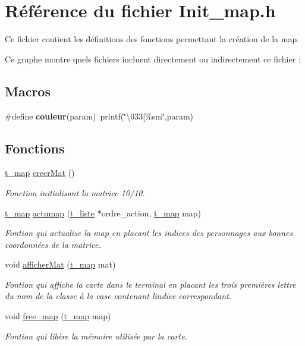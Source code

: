 \hypertarget{a00024}{}\section{Référence du fichier Init\+\_\+map.\+h}
\label{a00024}


Ce fichier contient les définitions des fonctions permettant la création de la map.  


Ce graphe montre quels fichiers incluent directement ou indirectement ce fichier \+:
\subsection*{Macros}
\begin{DoxyCompactItemize}
\item 
\#define {\bfseries couleur}(param)~printf(\char`\"{}\textbackslash{}033\mbox{[}\%sm\char`\"{},param)\hypertarget{a00024_aabcb2d6536b6c0ab41f99493c911489b}{}\label{a00024_aabcb2d6536b6c0ab41f99493c911489b}

\end{DoxyCompactItemize}
\subsection*{Fonctions}
\begin{DoxyCompactItemize}
\item 
\hyperlink{a00008}{t\+\_\+map} \hyperlink{a00024_aabb31eb0a9fed7b9013e4a396d92d8ae}{creer\+Mat} ()
\begin{DoxyCompactList}\small\item\em Fonction initialisant la matrice 10/10. \end{DoxyCompactList}\item 
\hyperlink{a00008}{t\+\_\+map} \hyperlink{a00024_aec2a5741ffb31e12f61b24165c7f68b4}{actumap} (\hyperlink{a00007}{t\+\_\+liste} $\ast$ordre\+\_\+action, \hyperlink{a00008}{t\+\_\+map} map)
\begin{DoxyCompactList}\small\item\em Fontion qui actualise la map en placant les indices des personnages aux bonnes coordonnées de la matrice. \end{DoxyCompactList}\item 
void \hyperlink{a00024_a1280978369430f0c5e9696d4ef52517c}{afficher\+Mat} (\hyperlink{a00008}{t\+\_\+map} mat)
\begin{DoxyCompactList}\small\item\em Fontion qui affiche la carte dans le terminal en placant les trois premières lettre du nom de la classe à la case contenant l\textquotesingle{}indice correspondant. \end{DoxyCompactList}\item 
void \hyperlink{a00024_a37963b5f2d2efb0fa80a11ac2999be5c}{free\+\_\+map} (\hyperlink{a00008}{t\+\_\+map} map)
\begin{DoxyCompactList}\small\item\em Fontion qui libère la mémoire utilisée par la carte. \end{DoxyCompactList}\end{DoxyCompactItemize}


